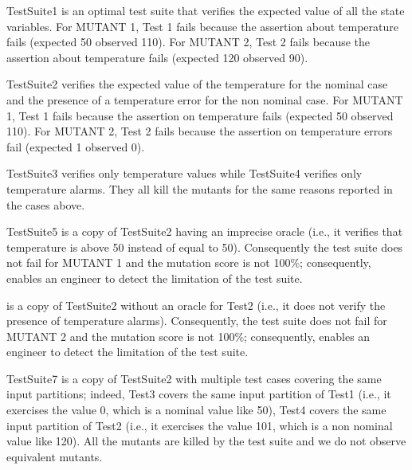 TestSuite1 is an optimal test suite that verifies the expected value of all the state variables. For MUTANT 1, Test 1 fails because the assertion about temperature fails (expected 50 observed 110).
For MUTANT 2, Test 2 fails because the assertion about temperature fails (expected 120 observed 90).

TestSuite2 verifies the expected value of the temperature for the nominal case and the presence of a temperature error for the non nominal case. For MUTANT 1, Test 1 fails because the assertion on temperature fails (expected 50 observed 110).
For MUTANT 2, Test 2 fails because the assertion on temperature errors fail (expected 1 observed 0).

TestSuite3 verifies only temperature values while TestSuite4 verifies only temperature alarms. They all kill the mutants for the same reasons reported in the cases above. 


TestSuite5 is a copy of TestSuite2 having an imprecise oracle (i.e., it verifies that temperature is above 50 instead of equal to 50). Consequently the test suite does not fail for MUTANT 1 and the mutation score is not 100\%; consequently, \APPR enables an engineer to detect the limitation of the test suite.

 is a copy of TestSuite2 without an oracle for Test2 (i.e., it does not verify the presence of temperature alarms). Consequently, the test suite does not fail for MUTANT 2 and the mutation score is not 100\%; consequently, \APPR enables an engineer to detect the limitation of the test suite.

TestSuite7 is a copy of TestSuite2 with multiple test cases covering the same input partitions; indeed, Test3 covers the same input partition of Test1 (i.e., it exercises the value 0, which is a nominal value like 50), Test4 covers the same input partition of Test2 (i.e., it exercises the value 101, which is a non nominal value like 120). All the mutants are killed by the test suite and we do not observe equivalent mutants.

